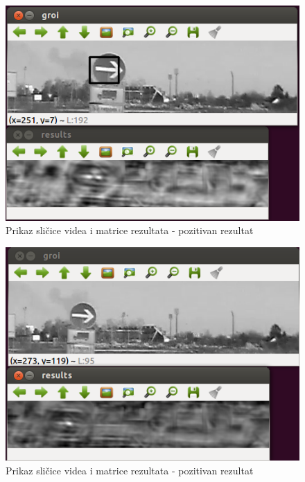 \begin{figure}[h]
\centering
\includegraphics[scale=0.5]{figures/06.png}
\caption{Prikaz sličice videa i matrice rezultata - pozitivan rezultat}
\label{fig:06.png}
\end{figure}

\begin{figure}[h]
\centering
\includegraphics[scale=0.5]{figures/07.png}
\caption{Prikaz sličice videa i matrice rezultata - pozitivan rezultat}
\label{fig:07.png}
\end{figure}


